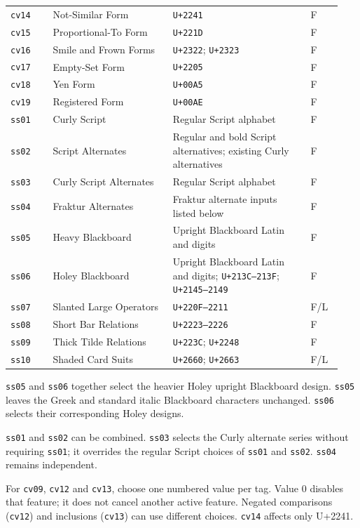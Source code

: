 \documentclass[10pt]{article}
\newcommand\feat[1]{\texttt{#1}}
\begin{document}
\begin{longtable}{@{}p{0.12\linewidth}>{\raggedright\arraybackslash}p{0.34\linewidth}p{0.39\linewidth}p{0.09\linewidth}@{}}
\texttt{cv14} & Not-Similar Form & \texttt{U+2241} & F \\
\texttt{cv15} & Proportional-To Form & \texttt{U+221D} & F \\
\texttt{cv16} & Smile and Frown Forms & \texttt{U+2322}; \texttt{U+2323} & F \\
\texttt{cv17} & Empty-Set Form & \texttt{U+2205} & F \\
\texttt{cv18} & Yen Form & \texttt{U+00A5} & F \\
\texttt{cv19} & Registered Form & \texttt{U+00AE} & F \\
\texttt{ss01} & Curly Script & Regular Script alphabet & F \\
\texttt{ss02} & Script Alternates & Regular and bold Script alternatives;
existing Curly alternatives & F \\
\texttt{ss03} & Curly Script Alternates & Regular Script alphabet & F \\
\texttt{ss04} & Fraktur Alternates & Fraktur alternate inputs listed below
& F \\
\texttt{ss05} & Heavy Blackboard & Upright Blackboard Latin and digits & F \\
\texttt{ss06} & Holey Blackboard & Upright Blackboard Latin and digits;
\texttt{U+213C--213F}; \texttt{U+2145--2149} & F \\
\texttt{ss07} & Slanted Large Operators & \texttt{U+220F--2211} & F/L \\
\texttt{ss08} & Short Bar Relations & \texttt{U+2223--2226} & F \\
\texttt{ss09} & Thick Tilde Relations & \texttt{U+223C}; \texttt{U+2248} & F \\
\texttt{ss10} & Shaded Card Suits & \texttt{U+2660}; \texttt{U+2663} & F/L \\
\end{longtable}\endgroup

\feat{ss05} and \feat{ss06} together select the heavier Holey upright
Blackboard design. \feat{ss05} leaves the Greek and standard italic
Blackboard characters unchanged. \feat{ss06} selects their corresponding
Holey designs.

\feat{ss01} and \feat{ss02} can be combined. \feat{ss03} selects the Curly
alternate series without requiring \feat{ss01}; it overrides the regular
Script choices of \feat{ss01} and \feat{ss02}. \feat{ss04} remains independent.

For \feat{cv09}, \feat{cv12} and \feat{cv13}, choose one numbered
value per tag. Value 0 disables that feature; it does not cancel another
active feature. Negated comparisons (\feat{cv12}) and inclusions
(\feat{cv13}) can use different choices. \feat{cv14} affects only U+2241.
\end{document}
